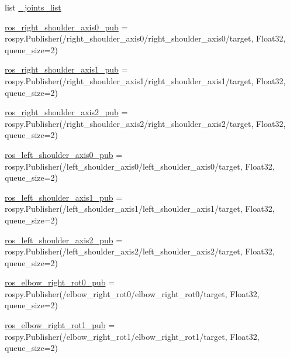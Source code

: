 \begin{DoxyCompactItemize}
\item 
list \mbox{\hyperlink{namespacesteering__response__test_a8e026198ba41dba4757c7c7ac06ad186}{\+\_\+joints\+\_\+list}}
\item 
\mbox{\hyperlink{namespacesteering__response__test_a7d95ffad2d7aa91cdef32b308e22e5c4}{ros\+\_\+right\+\_\+shoulder\+\_\+axis0\+\_\+pub}} = rospy.\+Publisher(\textquotesingle{}/right\+\_\+shoulder\+\_\+axis0/right\+\_\+shoulder\+\_\+axis0/target\textquotesingle{}, Float32, queue\+\_\+size=2)
\item 
\mbox{\hyperlink{namespacesteering__response__test_a62888dca3a6cfe4efb23748f30498281}{ros\+\_\+right\+\_\+shoulder\+\_\+axis1\+\_\+pub}} = rospy.\+Publisher(\textquotesingle{}/right\+\_\+shoulder\+\_\+axis1/right\+\_\+shoulder\+\_\+axis1/target\textquotesingle{}, Float32, queue\+\_\+size=2)
\item 
\mbox{\hyperlink{namespacesteering__response__test_ac27f35647afe16d0ec22e956ae47efe6}{ros\+\_\+right\+\_\+shoulder\+\_\+axis2\+\_\+pub}} = rospy.\+Publisher(\textquotesingle{}/right\+\_\+shoulder\+\_\+axis2/right\+\_\+shoulder\+\_\+axis2/target\textquotesingle{}, Float32, queue\+\_\+size=2)
\item 
\mbox{\hyperlink{namespacesteering__response__test_a562ca520cb370619ff53475d5b0baaa3}{ros\+\_\+left\+\_\+shoulder\+\_\+axis0\+\_\+pub}} = rospy.\+Publisher(\textquotesingle{}/left\+\_\+shoulder\+\_\+axis0/left\+\_\+shoulder\+\_\+axis0/target\textquotesingle{}, Float32, queue\+\_\+size=2)
\item 
\mbox{\hyperlink{namespacesteering__response__test_a8813bafd783fcf77d96ad86d2a514cad}{ros\+\_\+left\+\_\+shoulder\+\_\+axis1\+\_\+pub}} = rospy.\+Publisher(\textquotesingle{}/left\+\_\+shoulder\+\_\+axis1/left\+\_\+shoulder\+\_\+axis1/target\textquotesingle{}, Float32, queue\+\_\+size=2)
\item 
\mbox{\hyperlink{namespacesteering__response__test_a153630f3c413df81da9b6399d49377ec}{ros\+\_\+left\+\_\+shoulder\+\_\+axis2\+\_\+pub}} = rospy.\+Publisher(\textquotesingle{}/left\+\_\+shoulder\+\_\+axis2/left\+\_\+shoulder\+\_\+axis2/target\textquotesingle{}, Float32, queue\+\_\+size=2)
\item 
\mbox{\hyperlink{namespacesteering__response__test_a804745f34c187792f567f9bd8744db70}{ros\+\_\+elbow\+\_\+right\+\_\+rot0\+\_\+pub}} = rospy.\+Publisher(\textquotesingle{}/elbow\+\_\+right\+\_\+rot0/elbow\+\_\+right\+\_\+rot0/target\textquotesingle{}, Float32, queue\+\_\+size=2)
\item 
\mbox{\hyperlink{namespacesteering__response__test_a789e2c971f8b6c9acb1341b931ae5a07}{ros\+\_\+elbow\+\_\+right\+\_\+rot1\+\_\+pub}} = rospy.\+Publisher(\textquotesingle{}/elbow\+\_\+right\+\_\+rot1/elbow\+\_\+right\+\_\+rot1/target\textquotesingle{}, Float32, queue\+\_\+size=2)

\end{DoxyCompactItemize}
